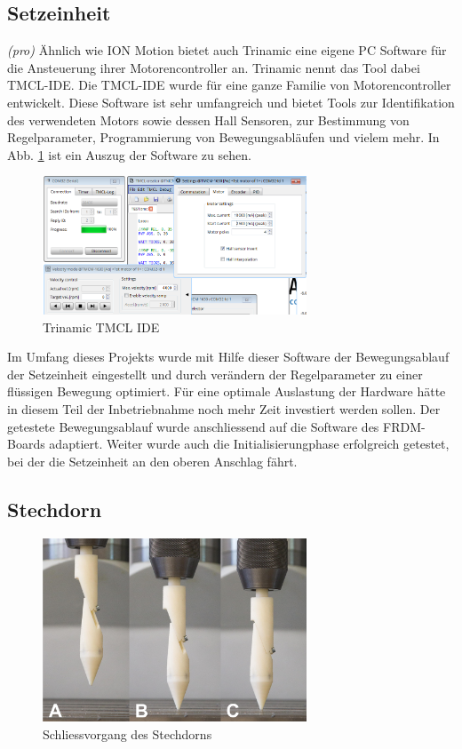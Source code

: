 \subsection{Setzeinheit} \label{sec:Inbetriebnahme_Setzeinheit}
\textit{(pro)} Ähnlich wie ION Motion bietet auch Trinamic eine eigene PC Software für die Ansteuerung ihrer Motorencontroller an. Trinamic nennt das Tool dabei TMCL-IDE. Die TMCL-IDE wurde für eine ganze Familie von Motorencontroller entwickelt. Diese Software ist sehr umfangreich und bietet Tools zur Identifikation des verwendeten Motors sowie dessen Hall Sensoren, zur Bestimmung von Regelparameter, Programmierung von Bewegungsabläufen und vielem mehr. In Abb. \ref{fig:TMCL-IDE} ist ein Auszug der Software zu sehen.

\begin{figure}[H]
	\includegraphics[width=0.7\textwidth]{Illustrationen/7-Inbetriebnahme_und_Kalibration/TMCL_IDE.png}
	\caption{Trinamic TMCL IDE}
	\label{fig:TMCL-IDE}
\end{figure}

Im Umfang dieses Projekts wurde mit Hilfe dieser Software der Bewegungsablauf der Setzeinheit eingestellt und durch verändern der Regelparameter zu einer flüssigen Bewegung optimiert. Für eine optimale Auslastung der Hardware hätte in diesem Teil der Inbetriebnahme noch mehr Zeit investiert werden sollen. Der getestete Bewegungsablauf wurde anschliessend auf die Software des FRDM-Boards adaptiert. Weiter wurde auch die Initialisierungphase erfolgreich getestet, bei der die Setzeinheit an den oberen Anschlag fährt.

\subsection{Stechdorn}
\begin{figure}[H]
	\includegraphics[width=0.7\textwidth]{Illustrationen/7-Inbetriebnahme_und_Kalibration/inbet_stechdorn.jpg}
	\caption{Schliessvorgang des Stechdorns}
	\label{fig:inbet_stechdorn}
\end{figure}